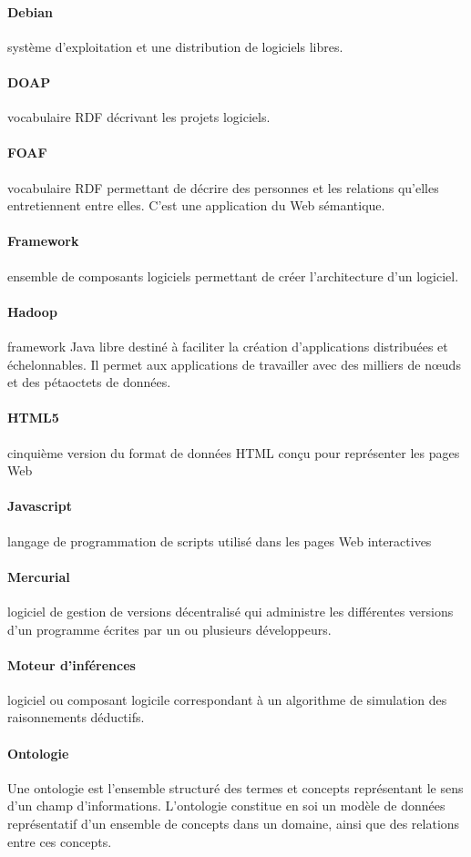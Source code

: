 \documentclass {report}
\begin{document}
\paragraph{Debian}système d'exploitation et une distribution de logiciels libres.
\paragraph{DOAP}vocabulaire RDF décrivant les projets logiciels.
\paragraph{FOAF}vocabulaire RDF permettant de décrire des personnes et les relations qu’elles entretiennent entre elles. C'est une application du Web sémantique.
\paragraph{Framework}ensemble de composants logiciels permettant de créer l'architecture d'un logiciel.
\paragraph{Hadoop}framework Java libre destiné à faciliter la création d'applications distribuées et échelonnables. Il permet aux applications de travailler avec des milliers de nœuds et des pétaoctets de données.
\paragraph{HTML5}cinquième version du format de données HTML conçu pour représenter les pages Web
\paragraph{Javascript}langage de programmation de scripts utilisé dans les pages Web interactives
\paragraph{Mercurial}logiciel de gestion de versions décentralisé qui administre les différentes versions d'un programme écrites par un ou plusieurs développeurs.
\paragraph{Moteur d'inférences}logiciel ou composant logicile correspondant à un algorithme de simulation des raisonnements déductifs.
\paragraph{Ontologie}Une ontologie est l'ensemble structuré des termes et concepts représentant le sens d'un champ d'informations. L'ontologie constitue en soi un modèle de données représentatif d'un ensemble de concepts dans un domaine, ainsi que des relations entre ces concepts.
\end{document}
